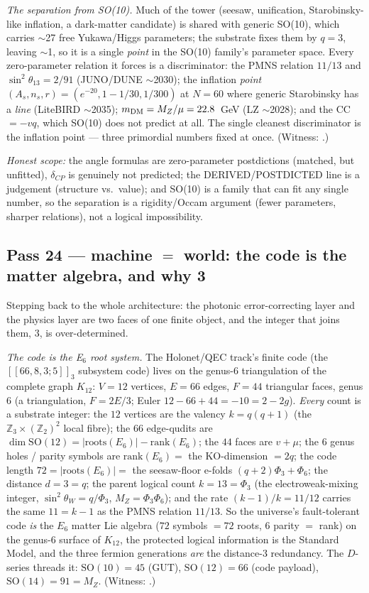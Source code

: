\documentclass[11pt]{article}
\begin{document}
\emph{The separation from SO(10).} Much of the tower (seesaw, unification, Starobinsky-like
inflation, a dark-matter candidate) is shared with generic SO(10), which carries $\sim$27 free
Yukawa/Higgs parameters; the substrate fixes them by $q=3$, leaving $\sim$1, so it is a single
\emph{point} in the SO(10) family's parameter space. Every zero-parameter relation it forces is a
discriminator: the PMNS relation $11/13$ and $\sin^2\theta_{13}=2/91$ (JUNO/DUNE $\sim$2030); the
inflation \emph{point} $(A_s,n_s,r)=(e^{-20},1{-}1/30,1/300)$ at $N=60$ where generic Starobinsky
has a \emph{line} (LiteBIRD $\sim$2035); $m_{\rm DM}=M_Z/\mu=22.8$~GeV (LZ $\sim$2028); and the CC
$=-vq$, which SO(10) does not predict at all. The single cleanest discriminator is the inflation
point --- three primordial numbers fixed at once. (Witness: .)

\emph{Honest scope:} the angle formulas are zero-parameter postdictions (matched, but unfitted),
$\delta_{CP}$ is genuinely not predicted; the DERIVED/POSTDICTED line is a judgement (structure
vs.\ value); and SO(10) is a family that can fit any single number, so the separation is a
rigidity/Occam argument (fewer parameters, sharper relations), not a logical impossibility.

\subsection{Pass 24 --- machine $=$ world: the code is the matter algebra, and why 3}
\label{sec:capstone-twentyfour}

Stepping back to the whole architecture: the photonic error-correcting layer and the physics
layer are two faces of one finite object, and the integer that joins them, $3$, is over-determined.

\emph{The code is the E$_6$ root system.} The Holonet/QEC track's finite code (the
$[\![66,8,3;5]\!]_3$ subsystem code) lives on the genus-$6$ triangulation of the
complete graph $K_{12}$: $V=12$ vertices, $E=66$ edges, $F=44$ triangular faces, genus $6$ (a
triangulation, $F=2E/3$; Euler $12-66+44=-10=2-2g$). \emph{Every} count is a substrate integer:
the $12$ vertices are the valency $k=q(q+1)$ (the $\mathbb{Z}_3\times(\mathbb{Z}_2)^2$ local
fibre); the $66$ edge-qudits are $\dim\mathrm{SO}(12)=|\mathrm{roots}(E_6)|-\mathrm{rank}(E_6)$;
the $44$ faces are $v+\mu$; the $6$ genus holes / parity symbols are $\mathrm{rank}(E_6)=$ the
KO-dimension $=2q$; the code length $72=|\mathrm{roots}(E_6)|=$ the seesaw-floor e-folds
$(q{+}2)\Phi_3+\Phi_6$; the distance $d=3=q$; the parent logical count $k=13=\Phi_3$ (the
electroweak-mixing integer, $\sin^2\theta_W=q/\Phi_3$, $M_Z=\Phi_3\Phi_6$); and the rate
$(k{-}1)/k=11/12$ carries the same $11=k-1$ as the PMNS relation $11/13$. So the universe's
fault-tolerant code \emph{is} the $E_6$ matter Lie algebra ($72$ symbols $=72$ roots, $6$ parity
$=$ rank) on the genus-$6$ surface of $K_{12}$, the protected logical information is the Standard
Model, and the three fermion generations \emph{are} the distance-$3$ redundancy. The $D$-series
threads it: $\mathrm{SO}(10)=45$ (GUT), $\mathrm{SO}(12)=66$ (code payload), $\mathrm{SO}(14)=91=
M_Z$. (Witness: .)
\end{document}
